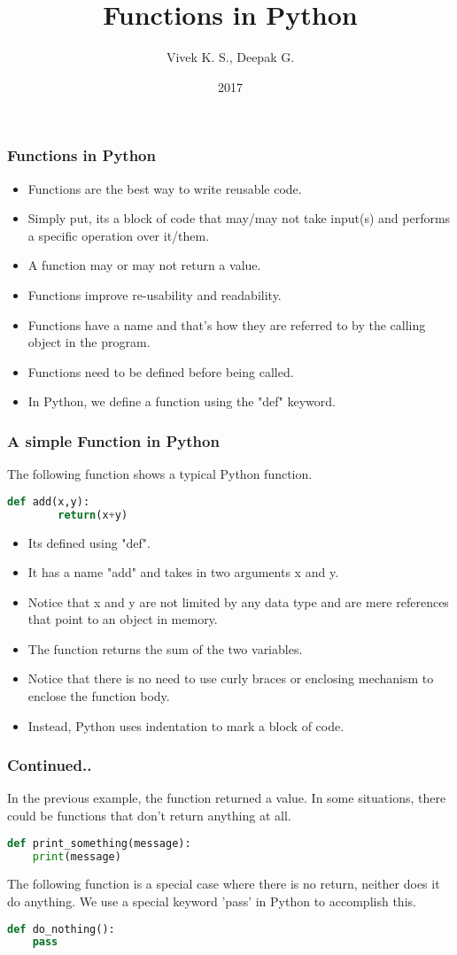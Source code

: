 \documentclass{beamer}
\title{Functions in Python}
\author{Vivek K. S., Deepak G.}
\institute{Information Systems Decision Sciences (ISDS)\\
MUMA College of Business\\
University of South Florida \\
Tampa, Florida}
\date{2017}
\begin{document}
\frame{\titlepage}

\begin{frame}
\frametitle{Functions in Python}
\begin{itemize}
\item Functions are the best way to write reusable code.
\item Simply put, its a block of code that may/may not take input(s) and performs a specific operation over it/them.
\item A function may or may not return a value.
\item Functions improve re-usability and readability.
\item Functions have a name and that's how they are referred to by the calling object in the program.
\item Functions need to be defined before being called.
\item In Python, we define a function using the "def" keyword.
\end{itemize}
\end{frame}

\begin{frame}[fragile]
\frametitle{A simple Function in Python}
The following function shows a typical Python function.
\begin{lstlisting}[language=Python]
	def add(x,y):
		return(x+y)
\end{lstlisting}
\begin{itemize}
\item Its defined using "def".
\item It has a name "add" and takes in two arguments x and y.
\item Notice that x and y are not limited by any data type and are mere references that point to an object in memory.
\item The function returns the sum of the two variables.
\item Notice that there is no need to use curly braces or enclosing mechanism to enclose the function body.
\item Instead, Python uses indentation to mark a block of code.
\end{itemize}

\end{frame}

\begin{frame}[fragile]
\frametitle{Continued..}
In the previous example, the function returned a value. In some situations, there could be functions that don't return anything at all.
\begin{lstlisting}[language=Python]
def print_something(message):
	print(message)
\end{lstlisting}

The following function is a special case where there is no return, neither does it do anything. We use a special keyword 'pass' in Python to accomplish this.
\begin{lstlisting}[language=Python]
def do_nothing():
	pass
\end{lstlisting}
\end{frame}
\end{document}
